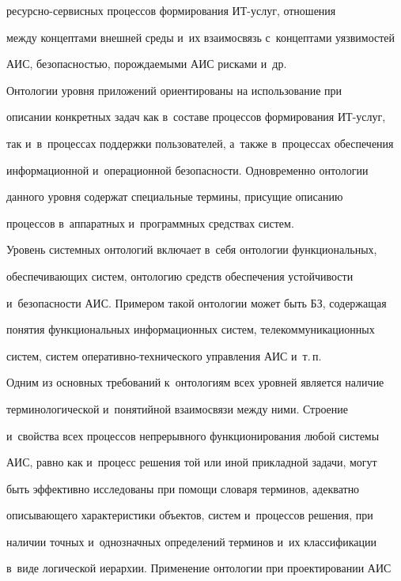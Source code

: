 ре\-сурс\-но-сер\-вис\-ных процессов формирования ИТ-услуг, отношения 


между концептами внешней среды и~их взаимосвязь с~концептами уязвимостей 


АИС, безопасностью, порождаемыми АИС рисками и~др. 


  


  Онтологии уровня приложений ориентированы на использование при 


описании конкретных задач как в~составе процессов формирования ИТ-услуг, 


так и~в~процессах поддержки пользователей, а~также в~процессах обеспечения 


информационной и~операционной безопасности. Одновременно онтологии 


данного уровня содержат специальные термины, присущие описанию 


процессов в~аппаратных и~программных средствах систем.


  


  Уровень системных онтологий включает в~себя онтологии функциональных, 


обеспечивающих систем, онтологию средств обеспечения устойчивости 


и~без\-опас\-ности АИС. Примером такой онтологии может быть БЗ, содержащая 


понятия функциональных информационных систем, телекоммуникационных 


систем, сис\-тем оперативно-технического управления АИС и~т.\,п.


  


  Одним из основных требований к~онтологиям всех уровней является наличие 


терминологической и~понятийной взаимосвязи между ними. Строение 


и~свойства всех процессов непрерывного функционирования любой системы 


АИС, равно как и~процесс решения той или иной прикладной задачи, могут 


быть эффективно исследованы при помощи словаря терминов, адекватно 


описывающего характеристики объектов, систем и~процессов решения, при 


наличии точных и~однозначных определений терминов и~их классификации 


в~виде логической иерархии. Применение онтологии при проектировании АИС 


